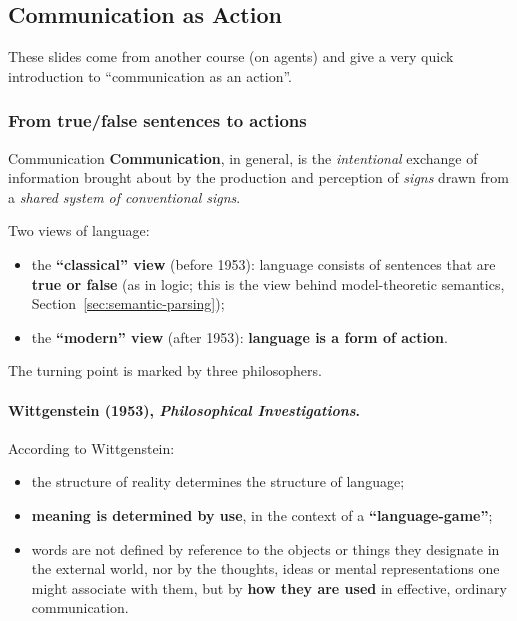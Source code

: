 \subsection{Communication as Action}
\label{sec:communication-as-action}

These slides come from another course (on agents) and give a very quick introduction to
``communication as an action''.

\subsubsection{From true/false sentences to actions}

\begin{nbdef}{Communication}
\textbf{Communication}, in general, is the \emph{intentional} exchange of information
brought about by the production and perception of \emph{signs} drawn from a
\emph{shared system of conventional signs}.
\end{nbdef}

Two views of language:
\begin{itemize}[nosep]
  \item the \textbf{``classical'' view} (before 1953): language consists of sentences
        that are \textbf{true or false} (as in logic; this is the view behind
        model-theoretic semantics, Section~\ref{sec:semantic-parsing});
  \item the \textbf{``modern'' view} (after 1953): \textbf{language is a form of
        action}.
\end{itemize}
The turning point is marked by three philosophers.

\paragraph{Wittgenstein (1953), \emph{Philosophical Investigations}.}
According to Wittgenstein:
\begin{itemize}[nosep]
  \item the structure of reality determines the structure of language;
  \item \textbf{meaning is determined by use}, in the context of a
        \textbf{``language-game''};
  \item words are not defined by reference to the objects or things they designate in
        the external world, nor by the thoughts, ideas or mental representations one
        might associate with them, but by \textbf{how they are used} in effective,
        ordinary communication.
\end{itemize}

